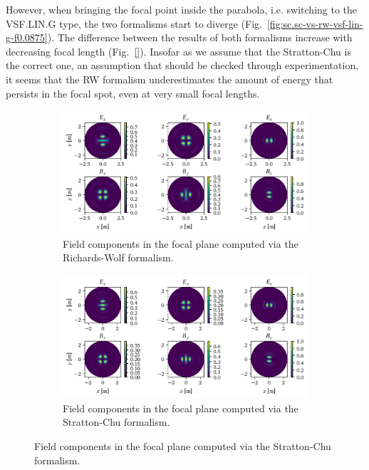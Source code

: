\documentclass[11pt,SymmetricalJury]{inrsthesis/inrsthesis}
\begin{document}
However, when bringing the focal point inside the parabola, i.e. switching to
the VSF.LIN.G type, the two formalisms start to diverge
(Fig.~\ref{fig:sc.sc-vs-rw-vsf-lin-g-f0.0875}). The difference between the
results of both formalisms increase with decreasing focal length (Fig.~\ref{}).
Insofar as we assume that the Stratton-Chu is the correct one, an assumption
that should be checked through experimentation, it seems that the RW formalism
underestimates the amount of energy that persists in the focal spot, even at
very small focal lengths.

\begin{figure}
  \begin{subfigure}{\textwidth}
    \centering
    \includegraphics[width=\textwidth]{figs//RichardsWolf_fpVSF.pdf}
    \caption[Richards-Wolf field components for the VSF.LIN.G.f0.00875 case.]
            {Field components in the focal plane computed via the Richards-Wolf
            formalism.}
    \label{fig:sc.rw.vsf-lin-g-na1}
  \end{subfigure}

  \begin{subfigure}{\textwidth}
    \centering
    \includegraphics[width=\textwidth]{figs/StrattonChu_fpVSF.pdf}
    \caption[Stratton-Chu field components for the VSF.LIN.G.f0.00875 case.]
            {Field components in the focal plane computed via the Stratton-Chu
            formalism.}
   \label{fig:sc.sc.vsf-lin-g-f0.0875}
  \end{subfigure}


\end{figure}
\end{document}
